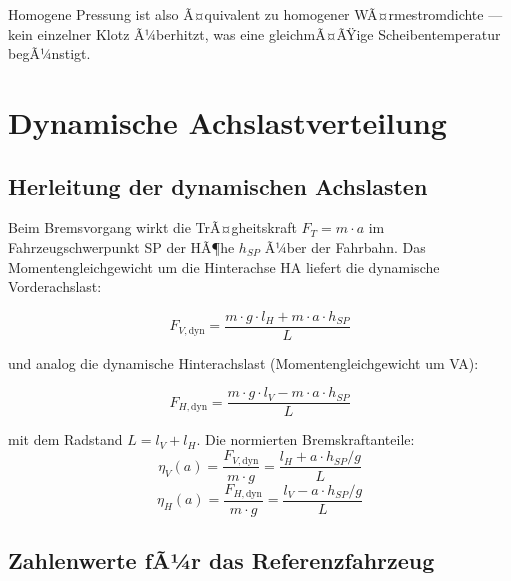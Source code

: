 ﻿\documentclass[12pt,a4paper]{article}
\theoremstyle{definition}
\begin{document}
Homogene Pressung ist also Ã¤quivalent zu homogener WÃ¤rmestromdichte ---
kein einzelner Klotz Ã¼berhitzt, was eine gleichmÃ¤ÃŸige Scheibentemperatur
begÃ¼nstigt.

\section{Dynamische Achslastverteilung}

\subsection{Herleitung der dynamischen Achslasten}

Beim Bremsvorgang wirkt die TrÃ¤gheitskraft $F_T = m \cdot a$ im
Fahrzeugschwerpunkt SP der HÃ¶he $h_{SP}$ Ã¼ber der Fahrbahn. 
Das Momentengleichgewicht um die Hinterachse HA liefert die
dynamische Vorderachslast:

\begin{equation}
  F_{V,\text{dyn}} = \frac{m \cdot g \cdot l_H + m \cdot a \cdot h_{SP}}{L}
  \label{eq:F_V_dyn}
\end{equation}

und analog die dynamische Hinterachslast (Momentengleichgewicht um VA):

\begin{equation}
  F_{H,\text{dyn}} = \frac{m \cdot g \cdot l_V - m \cdot a \cdot h_{SP}}{L}
  \label{eq:F_H_dyn}
\end{equation}

mit dem Radstand $L = l_V + l_H$.  Die normierten Bremskraftanteile:
\begin{equation}
  \eta_V(a) = \frac{F_{V,\text{dyn}}}{m \cdot g}
            = \frac{l_H + a \cdot h_{SP}/g}{L}
  \label{eq:eta_V}
\end{equation}
\begin{equation}
  \eta_H(a) = \frac{F_{H,\text{dyn}}}{m \cdot g}
            = \frac{l_V - a \cdot h_{SP}/g}{L}
  \label{eq:eta_H}
\end{equation}

\subsection{Zahlenwerte fÃ¼r das Referenzfahrzeug}
\end{document}
